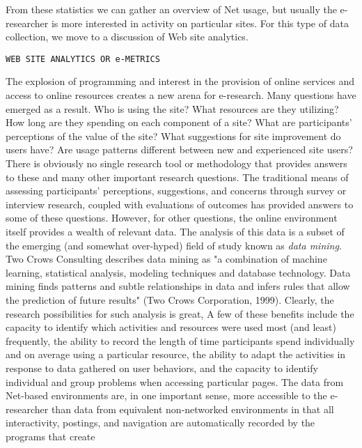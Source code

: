 \documentclass{book}
\begin{document}
From these statistics we can gather an overview of Net usage, but usually the e-researcher is more interested in activity on particular sites. For this type of data collection, we move to a discussion of Web site analytics.\\


\begin{flushleft}
\texttt{WEB SITE ANALYTICS OR e-METRICS}
\hspace*{0.5cm}
\end{flushleft}
\vspace*{0.5cm}
The explosion of programming and interest in the provision of online services and access to online resources creates a new arena for e-research. Many questions have emerged as a result. Who is using the site? What resources are they utilizing? How long are they spending on each component of a site? What are participants' perceptions of the value of the site? What suggestions for site improvement do users have? Are usage patterns different between new and experienced site users?
\\\hspace*{0.5cm}There is obviously no single research tool or methodology that provides answers to these and many other important research questions. The traditional means of assessing participants' perceptions, suggestions, and concerns through survey or interview research, coupled with evaluations of outcomes has provided answers to some of these questions. However, for other questions, the online environment itself provides a wealth of relevant data. The analysis of this data is a subset of the emerging (and somewhat over-hyped) field of study known as \emph{data mining}. Two Crows Consulting describes data mining as "a combination of machine learning, statistical analysis, modeling techniques and database technology. Data mining finds patterns and subtle relationships in data and infers rules that allow the prediction of future results" (Two Crows Corporation, 1999). Clearly, the research possibilities for such analysis is great, A few of these benefits include the capacity to identify which activities and resources were used most (and least) frequently, the ability to record the length of time participants spend individually and on average using a particular resource, the ability to adapt the activities in response to data gathered on user behaviors, and the capacity to identify individual and group problems when accessing particular pages. The data from Net-based environments are, in one important sense, more accessible to the e-researcher than data from equivalent non-networked environments in that all interactivity, postings, and navigation are automatically recorded by the programs that create
\end{document}
